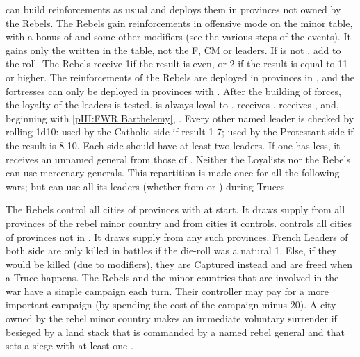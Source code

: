 \begin{digressions}
  \phadm
  \aparag \FRA can build reinforcements as usual and deploys them in provinces
  not owned by the Rebels.
  \aparag The Rebels gain reinforcements in offensive mode on the minor table,
  with a bonus of  and some other modifiers (see the various steps
  of the events). It gains only the \LD written in the table, not the F, CM or
  leaders.
  \bparag If \FRA is not \CATHCO, add  to the roll.
  \bparag The Rebels receive 1\fortress if the result is even, or 2\fortress
  if the result is equal to 11 or higher.
  \bparag The reinforcements of the Rebels are deployed in provinces in
  \REVOLT , and the fortresses can only be deployed in provinces with \REVOLT
  \faceplus.
  \aparag[Leaders] After the building of forces, the loyalty of the leaders is
  tested.
  \bparag \leaderMontmorency is always loyal to \FRA.
  \bparag \lig receives .
  \bparag \hug receives \leaderColigny, \leaderConde and, beginning with
  \ref{pIII:FWR Barthelemy}, \leaderNavarre.
  \bparag Every other named leader is checked by rolling 1d10: used by the
  Catholic side if result 1-7; used by the Protestant side if the result is
  8-10.
  \bparag Each side should have at least two leaders. If one has less, it
  receives an unnamed general from those of \FRA.
  \bparag Neither the Loyalists nor the Rebels can use mercenary generals.
  \bparag This repartition is made once for all the following wars; but \FRA
  can use all its leaders (whether from \lig or \hug) during Truces.



  \phmil
  \aparag The Rebels control all cities of provinces with \REVOLT at start.
  It draws supply from all provinces of the rebel minor country and from
  cities it controls.
  \aparag \FRA controls all cities of provinces not in \REVOLT .  It draws
  supply from any such provinces.
  \aparag French Leaders of both side are only killed in battles if the
  die-roll was a natural 1. Else, if they would be killed (due to modifiers),
  they are Captured instead and are freed when a Truce happens.
  \aparag The Rebels and the minor countries that are involved in the war have
  a simple campaign each turn. Their controller may pay for a more important
  campaign (by spending the cost of the campaign minus 20\ducats).
  \aparag A city owned by the rebel minor country makes an immediate voluntary
  surrender if besieged by a land stack that is commanded by a named rebel
  general and that sets a siege with at least one \ARMY \faceplus.



\end{digressions}
